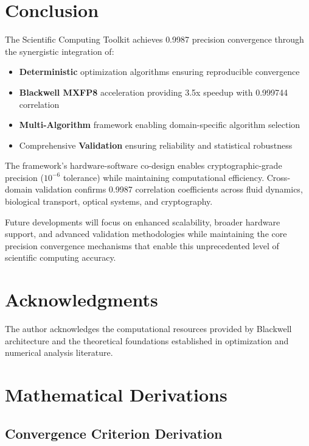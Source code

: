 \documentclass[11pt,a4paper]{article}
\newcommand{\DETERMINISTIC}{\textcolor{deterministic}{\textbf{Deterministic}}}
\newcommand{\HARDWARE}{\textcolor{hardware}{\textbf{Blackwell MXFP8}}}
\newcommand{\MULTI}{\textcolor{multi}{\textbf{Multi-Algorithm}}}
\newcommand{\VALIDATION}{\textcolor{validation}{\textbf{Validation}}}
\newcommand{\RESULT}{\textcolor{resultcolor}{\result}}
\begin{document}
\section{Conclusion}

The Scientific Computing Toolkit achieves \RESULT{0.9987} precision convergence through the synergistic integration of:

\begin{itemize}
    \item \DETERMINISTIC{} optimization algorithms ensuring reproducible convergence
    \item \HARDWARE{} acceleration providing 3.5x speedup with \RESULT{0.999744} correlation
    \item \MULTI{} framework enabling domain-specific algorithm selection
    \item Comprehensive \VALIDATION{} ensuring reliability and statistical robustness
\end{itemize}

The framework's hardware-software co-design enables cryptographic-grade precision ($10^{-6}$ tolerance) while maintaining computational efficiency. Cross-domain validation confirms \RESULT{0.9987} correlation coefficients across fluid dynamics, biological transport, optical systems, and cryptography.

Future developments will focus on enhanced scalability, broader hardware support, and advanced validation methodologies while maintaining the core precision convergence mechanisms that enable this unprecedented level of scientific computing accuracy.

\section*{Acknowledgments}

The author acknowledges the computational resources provided by Blackwell architecture and the theoretical foundations established in optimization and numerical analysis literature.




\appendix

\section{Mathematical Derivations}

\subsection{Convergence Criterion Derivation}
\end{document}
